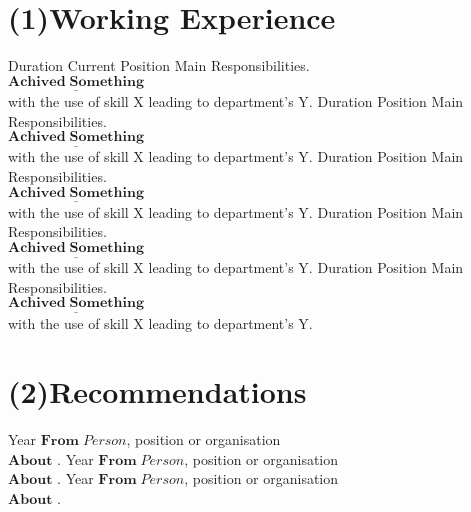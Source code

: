 \documentclass[usenames,dvipsnames,a4paper]{English_Resume}
\begin{document}
\section{(1)Working Experience}
	\begin{twenty}
		\twentyitem
			{Duration}
			{
			 \color{red!80}{Industry}}
			{Current Position}
			{Main Responsibilities.\\
			$\underline{\mathbf{Achived\; Something}}$\\ with the use of skill X
			leading to department's Y.}
		\twentyitem
			{Duration}
			{
			 \color{red!80}{Industry}}
			{Position}
			{Main Responsibilities.\\
			$\underline{\mathbf{Achived\; Something}}$\\ with the use of skill X
			leading to department's Y.}
		\twentyitem
			{Duration}
			{
			 \color{red!80}{Industry}}
			{Position}
			{Main Responsibilities.\\
			$\underline{\mathbf{Achived\; Something}}$\\ with the use of skill X
			leading to department's Y.}
		\twentyitem
			{Duration}
			{
			 \color{red!80}{Industry}}
			{Position}
			{Main Responsibilities.\\
			$\underline{\mathbf{Achived\; Something}}$\\ with the use of skill X
			leading to department's Y.}
		\twentyitem
			{Duration}
			{
			 \color{red!80}{Industry}}
			{Position}
			{Main Responsibilities.\\
			$\underline{\mathbf{Achived\; Something}}$\\ with the use of skill X
			leading to department's Y.}
	\end{twenty}

\section{(2)Recommendations}
	\begin{twentyshort}
		\twentyitemshort
			{Year}
			{$\mathbf{From}\; Person$, position or organisation
			\\ $\mathbf{About}$ .}
		\twentyitemshort
			{Year}
			{$\mathbf{From}\; Person$, position or organisation
			\\ $\mathbf{About}$ .}
		\twentyitemshort
			{Year}
			{$\mathbf{From}\; Person$, position or organisation
			\\ $\mathbf{About}$ .}
	\end{twentyshort}
\end{document}
